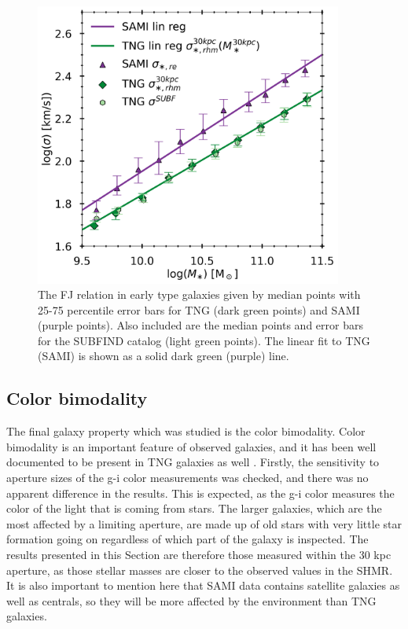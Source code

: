 \begin{figure}
    \centering
    \includegraphics[width=0.9\textwidth]{images/FJ.png}
    \caption{The FJ relation in early type galaxies given by median points with 25-75 percentile error bars for TNG (dark green points) and SAMI (purple points). Also included are the median points and error bars for the SUBFIND catalog (light green points). The linear fit to TNG (SAMI) is shown as a solid dark green (purple) line.}
    \label{FJ}
\end{figure}



\subsection{Color bimodality}
The final galaxy property which was studied is the color bimodality. Color bimodality is an important feature of observed galaxies, and it has been well documented to be present in TNG galaxies as well \parencite{Nelson2017}. Firstly, the sensitivity to aperture sizes of the g-i color measurements was checked, and there was no apparent difference in the results. This is expected, as the g-i color measures the color of the light that is coming from stars. The larger galaxies, which are the most affected by a limiting aperture, are made up of old stars with very little star formation going on regardless of which part of the galaxy is inspected. The results presented in this Section are therefore those measured within the 30 kpc aperture, as those stellar masses are closer to the observed values in the SHMR. It is also important to mention here that SAMI data contains satellite galaxies as well as centrals, so they will be more affected by the environment than TNG galaxies.

